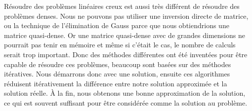 Résoudre des problèmes linéaires creux est aussi très différent de résoudre des problèmes denses.
%
Nous ne pouvons pas utiliser une inversion directe de matrice, ou la technique de l'élimination de Gauss parce que nous obtiendrions une matrice quasi-dense.
%
Or une matrice quasi-dense avec de grandes dimensions ne pourrait pas tenir en mémoire et même si c'était le cas, le nombre de calculs serait trop important.
%
Donc des méthodes différentes ont été inventées pour être capable de résoudre ces problèmes, beaucoup sont basées sur des méthodes itératives.
%
Nous démarrons donc avec une solution, ensuite ces algorithmes réduisent itérativement la différence entre notre solution approximée et la solution réelle.
%
\`{A} la fin, nous obtenons une bonne approximation de la solution, ce qui est souvent suffisant pour être considérée comme la solution au problème.
